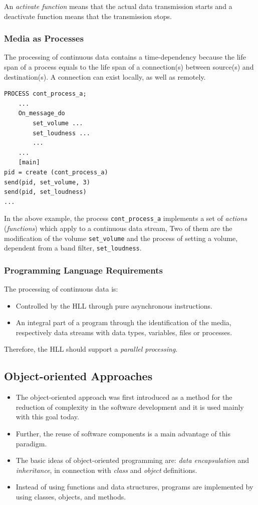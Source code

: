 An \textit{activate function} means that the actual data transmission starts and a deactivate function means that the transmission stops.

\subsubsection{Media as Processes}
The processing of continuous data contains a time-dependency because the life span of a process equals to the life span of a connection(s) between source(s) and destination(s). A connection can exist locally, as well as remotely.

\begin{lstlisting}
PROCESS cont_process_a;
	...
	On_message_do
		set_volume ...
		set_loudness ...
		...
	...
	[main]
pid = create (cont_process_a)
send(pid, set_volume, 3)
send(pid, set_loudness)
...
\end{lstlisting}
In the above example, the process \texttt{cont\_process\_a} implements a set of \textit{actions} (\textit{functions}) which apply to a continuous data stream, Two of them are the modification
of the volume \texttt{set\_volume} and the process of setting a volume, dependent from a band filter, \texttt{set\_loudness}.

\subsubsection{Programming Language Requirements}
The processing of continuous data is:
	\begin{itemize}
		\item Controlled by the HLL through pure asynchronous instructions.
		\item An integral part of a program through the identification of the media, respectively data streams with data types, variables, files or processes.
	\end{itemize}

Therefore, the HLL should support a \textit{parallel processing}.

\begin{multicols}{2}
	\subsection{Object-oriented Approaches}
	\begin{itemize}
		\item The object-oriented approach was first introduced as a method for the reduction of complexity in the software development and it is used mainly with this goal today.
		\item Further, the reuse of software components is a main advantage of this paradigm. 
		\item The basic ideas of object-oriented programming are: \textit{data encapsulation} and \textit{inheritance}, in connection with \textit{class} and \textit{object} definitions. 
		\item Instead of using functions and data structures, programs are implemented by using classes, objects, and methods.
	\end{itemize}
\end{multicols}



